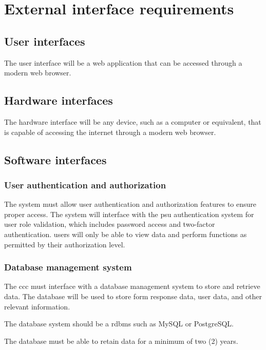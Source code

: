 \documentclass[letterpaper,article,oneside]{memoir}
\begin{document}
\section{External interface requirements}

\subsection{User interfaces}

The user interface will be a web application that can be accessed through a modern web browser.

\subsection{Hardware interfaces}

The hardware interface will be any device, such as a computer or equivalent, that is capable of accessing the internet through a modern web browser.

\subsection{Software interfaces}

\subsubsection{User authentication and authorization}

The system must allow user authentication and authorization features to ensure proper access.
The system will interface with the \gls{psu} authentication system for user role validation, which includes password access and two-factor authentication.
\Glspl{user} will only be able to view data and perform functions as permitted by their authorization level.

\subsubsection{Database management system}

The \gls{ccc} must interface with a database management system to store and retrieve data.
The database will be used to store \gls{form response} data, \gls{user} data, and other relevant information.

The database system should be a \gls{rdbms} such as MySQL or PostgreSQL.

The database must be able to retain data for a minimum of two (2) years.
\end{document}

